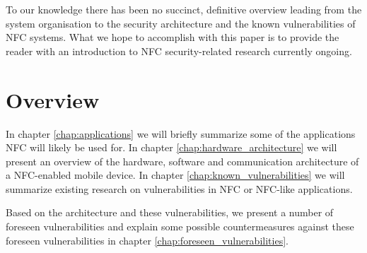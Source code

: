 To our knowledge there has been no succinct, definitive overview leading from the system organisation to the security architecture and the known vulnerabilities of NFC systems.
What we hope to accomplish with this paper is to provide the reader with an introduction to NFC security-related research currently ongoing.

\newpage

\section{Overview}
In chapter \ref{chap:applications} we will briefly summarize some of the applications NFC will likely be used for.
In chapter \ref{chap:hardware_architecture} we will present an overview of the hardware, software and communication architecture of a NFC-enabled mobile device.
In chapter \ref{chap:known_vulnerabilities} we will summarize existing research on vulnerabilities in NFC or NFC-like applications.

Based on the architecture and these vulnerabilities, we present a number of foreseen vulnerabilities and explain some possible countermeasures against these foreseen vulnerabilities in chapter \ref{chap:foreseen_vulnerabilities}.


